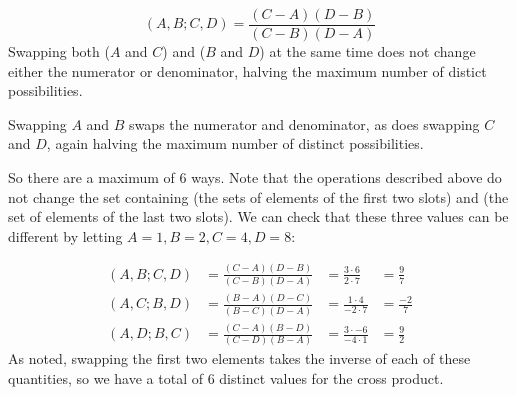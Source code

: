 \documentclass{homework}
\begin{document}
                                                                                                                      \begin{solution}
                                                                                                                      \[
                                                                                                                      (A,B;C,D) = \frac{(C-A)(D-B)}{(C-B)(D-A)}
                                                                                                                      \]
                                                                                                                      Swapping both ($A$ and $C$) and ($B$ and $D$) at the same time does not change either the numerator or denominator, halving the maximum number of distict possibilities.

                                                                                                                      Swapping $A$ and $B$ swaps the numerator and denominator, as does swapping $C$ and $D$, again halving the maximum number of distinct possibilities.

                                                                                                                      So there are a maximum of 6 ways. Note that the operations described above do not change the set containing (the sets of elements of the first two slots) and (the set of elements of the last two slots). We can check that these three values can be different by letting $A=1, B=2, C=4, D=8$:

                                                                                                                      \begin{align*}
                                                                                                                      (A,B;C,D) &= \frac{(C-A)(D-B)}{(C-B)(D-A)} &= \frac{3\cdot 6}{2\cdot 7} &= \frac{9}{7}\\
                                                                                                                      (A,C;B,D) &= \frac{(B-A)(D-C)}{(B-C)(D-A)} &= \frac{1\cdot 4}{-2\cdot 7} &= \frac{-2}{7}\\
                                                                                                                      (A,D;B,C) &= \frac{(C-A)(B-D)}{(C-D)(B-A)} &= \frac{3 \cdot -6}{-4 \cdot 1} &= \frac{9}{2}
                                                                                                                      \end{align*}
                                                                                                                      As noted, swapping the first two elements takes the inverse of each of these quantities, so we have a total of 6 distinct values for the cross product.

                                                                                                                      \end{solution}
\end{document}
